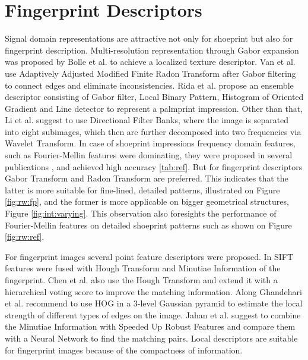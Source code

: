 \documentclass[draft,final]{vutinfth} %
\begin{document}
\section*{Fingerprint Descriptors}
\par
Signal domain representations are attractive not only for shoeprint but also for fingerprint description.
Multi-resolution representation through Gabor expansion was proposed by Bolle et al. \cite{bolle2012fingerprint} to achieve a localized texture descriptor.
Van et al. \cite{van2016fingerprint} use Adaptively Adjusted Modified Finite Radon Transform after Gabor filtering to connect edges and eliminate inconsistencies.
Rida et al. \cite{rida2018palmprint} propose an ensemble descriptor consisting of Gabor filter, Local Binary Pattern, Histogram of Oriented Gradient and Line detector to represent a palmprint impression.
Other than that, Li et al. \cite{li2012texture} suggest to use Directional Filter Banks, where the image is separated into eight subimages, which then are further decomposed into two frequencies via Wavelet Transform.
In case of shoeprint impressions frequency domain features, such as Fourier-Mellin features were dominating, they were proposed in several publications  \cite{gueham2007automatic}, \cite{wu2019crime} and achieved high accuracy \ref{tab:ref}.
But for fingerprint descriptors Gabor Transform and Radon Transform are preferred.
This indicates that the latter is more suitable for fine-lined, detailed patterns, illustrated on Figure \ref{fig:rw:fp}, and the former is more applicable on bigger geometrical structures, Figure \ref{fig:int:varying}.
This observation also foresights the performance of Fourier-Mellin features on detailed shoeprint patterns such as shown on Figure \ref{fig:rw:ref}. 
\par
For fingerprint images several point feature descriptors were proposed.
In \cite{zhou2011adaptive} SIFT \cite{lowe1999object} features were fused with Hough Transform and Minutiae Information of the fingerprint.
Chen et al. \cite{chen2013hierarchical} also use the Hough Transform and extend it with a hierarchical voting score to improve the matching information. 
Along  \cite{rida2018palmprint} Ghandehari et al. \cite{ghandehari2012palmprint} recommend to use HOG in a 3-level Gaussian pyramid to estimate the local strength of different types of edges on the image.
Jahan et al. \cite{jahan2017robust} suggest to combine the Minutiae Information with Speeded Up Robust Features and compare them with a Neural Network to find the matching pairs.
Local descriptors are suitable for fingerprint images because of the compactness of information.
\end{document}
